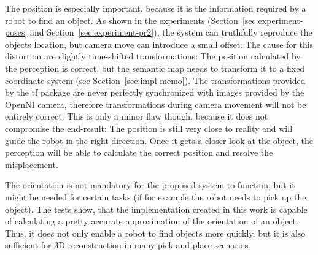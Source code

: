 The position is especially important, because it is the information required by a robot to find an object. As shown in the experiments (Section~\ref{sec:experiment-poses} and Section~\ref{sec:experiment-pr2}), the system can truthfully reproduce the objects location, but camera move can introduce a small offset. The cause for this distortion are slightly time-shifted transformations: The position calculated by the perception is correct, but the semantic map needs to transform it to a fixed coordinate system (see Section~\ref{sec:impl-memo}). The transformations provided by the tf package are never perfectly synchronized with images provided by the OpenNI camera, therefore transformations during camera movement will not be entirely correct. This is only a minor flaw though, because it does not compromise the end-result: The position is still very close to reality and will guide the robot in the right direction. Once it gets a closer look at the object, the perception will be able to calculate the correct position and resolve the misplacement.

The orientation is not mandatory for the proposed system to function, but it might be needed for certain tasks (if for example the robot needs to pick up the object). The tests show, that the implementation created in this work is capable of calculating a pretty accurate approximation of the orientation of an object. Thus, it does not only enable a robot to find objects more quickly, but it is also sufficient for 3D reconstruction in many pick-and-place scenarios.

